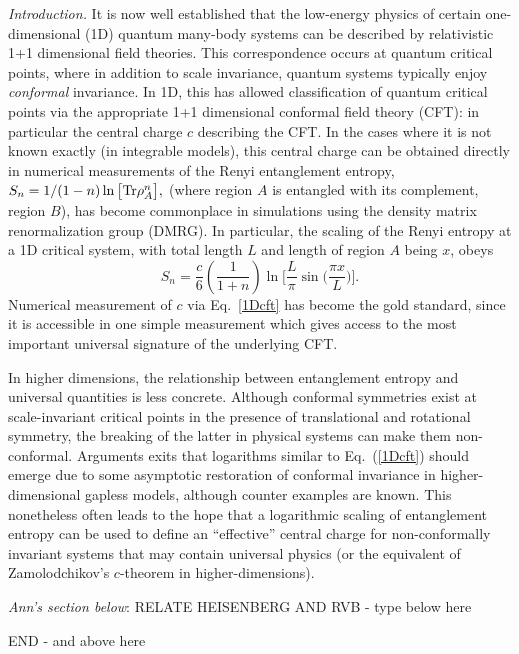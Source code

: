 \documentclass[prl,aps,twocolumn,floatfix,amsmath,amssymb,superscriptaddress,tightenlines]{revtex4}
\begin{document}
{\it Introduction.} It is now well established that the low-energy physics of certain one-dimensional (1D) quantum many-body systems can be described by relativistic 1+1 dimensional field theories.  This correspondence occurs at quantum critical points, where in addition to scale invariance, quantum systems typically enjoy {\it conformal} invariance.  In 1D, this has allowed classification of quantum critical points via the appropriate 1+1 dimensional conformal field theory (CFT): in particular the central charge $c$ describing the CFT.
In the cases where it is not known exactly (in integrable models), 
this central charge can be obtained directly in numerical measurements of the Renyi entanglement entropy,
$
S_n = 1/(1-n) \ln \big[ {\rm Tr} \rho_A^n \big],
$
(where region $A$ is entangled with its complement, region $B$), has become commonplace in simulations using the density matrix renormalization group (DMRG).  In particular, the
scaling of the Renyi entropy at a 1D critical system, with total length $L$ and length of region $A$ being $x$, obeys
\begin{equation}
S_n = \frac{c}{6}\left({ \frac{1}{1+n} }\right) \ln\Big[ \frac{L}{\pi} \sin\big( \frac{\pi x}{L} \big) \Big]. \label{1Dcft}
\end{equation}
Numerical measurement of $c$ via Eq.~\ref{1Dcft} has become the gold standard, since it is accessible in one simple measurement which gives access to the most important universal signature of the underlying CFT.

In higher dimensions, the relationship between entanglement entropy and universal quantities is less concrete.  Although conformal symmetries exist at scale-invariant critical points in the presence of translational and rotational symmetry, the breaking of the latter in physical systems can make them non-conformal.  Arguments exits that logarithms similar to Eq.~(\ref{1Dcft}) should emerge due to some asymptotic restoration of conformal invariance in higher-dimensional gapless models, although counter examples are known.  This nonetheless often leads to the hope that a logarithmic scaling of entanglement entropy can be used to define an ``effective'' central charge for non-conformally invariant systems that may contain universal physics (or the equivalent of Zamolodchikov's $c$-theorem in higher-dimensions).

{\it Ann's section below}:
RELATE HEISENBERG AND RVB - type below here

END - and above here
\end{document}
